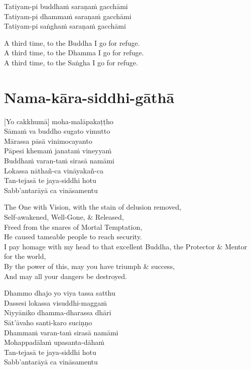 Tatiyam-pi buddhaṁ saraṇaṁ gacchāmi\\
Tatiyam-pi dhammaṁ saraṇaṁ gacchāmi\\
Tatiyam-pi saṅghaṁ saraṇaṁ gacchāmi

\begin{english-verses}
  A third time, to the Buddha I go for refuge.\\
  A third time, to the Dhamma I go for refuge.\\
  A third time, to the Saṅgha I go for refuge.
\end{english-verses}

\section{Nama-kāra-siddhi-gāthā}
\label{nama-kara-siddhi-gatha}

[Yo cakkhumā] moha-malāpakaṭṭho\\
Sāmaṁ va buddho sugato vimutto\\
Mārassa pāsā vinimocayanto\\
Pāpesi khemaṁ janataṁ vineyyaṁ\\
Buddhaṁ varan-taṁ sirasā namāmi\\
Lokassa nāthañ-ca vināyakañ-ca\\
Tan-tejasā te jaya-siddhi hotu\\
Sabb'antarāyā ca vināsamentu

\begin{english-verses}
  The One with Vision, with the stain of delusion removed,\\
  Self-awakened, Well-Gone, \& Released,\\
  Freed from the snares of Mortal Temptation,\\
  He caused tameable people to reach security.\\
  I pay homage with my head to that excellent Buddha, the Protector \& Mentor for the world,\\
  By the power of this, may you have triumph \& success,\\
  And may all your dangers be destroyed.
\end{english-verses}

Dhammo dhajo yo viya tassa satthu\\
Dassesi lokassa visuddhi-maggaṁ\\
Niyyāniko dhamma-dharassa dhārī\\
Sāt'āvaho santi-karo suciṇṇo\\
Dhammaṁ varan-taṁ sirasā namāmi\\
Mohappadālaṁ upasanta-dāhaṁ\\
Tan-tejasā te jaya-siddhi hotu\\
Sabb'antarāyā ca vināsamentu

